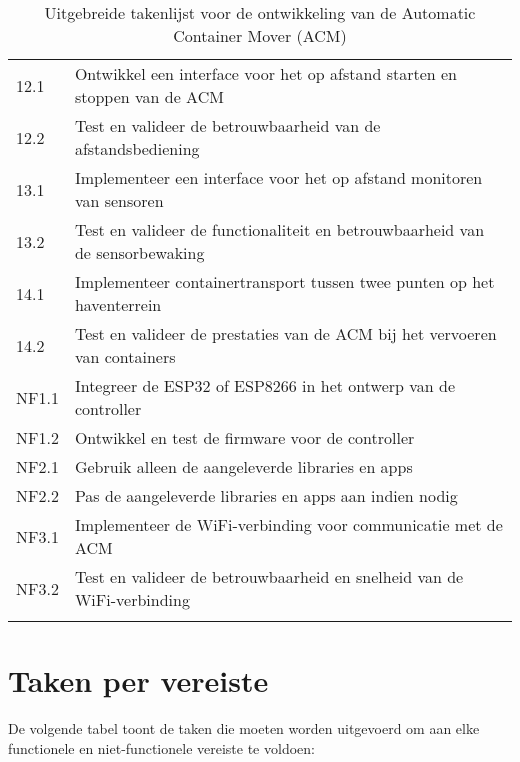 \begin{longtable}{@{}ll@{}}
    12.1       & Ontwikkel een interface voor het op afstand starten en stoppen van de ACM                          \\
    12.2       & Test en valideer de betrouwbaarheid van de afstandsbediening                                       \\

    13.1       & Implementeer een interface voor het op afstand monitoren van sensoren                              \\
    13.2       & Test en valideer de functionaliteit en betrouwbaarheid van de sensorbewaking                       \\

    14.1       & Implementeer containertransport tussen twee punten op het haventerrein                             \\
    14.2       & Test en valideer de prestaties van de ACM bij het vervoeren van containers                         \\

    NF1.1      & Integreer de ESP32 of ESP8266 in het ontwerp van de controller                                     \\
    NF1.2      & Ontwikkel en test de firmware voor de controller                                                   \\

    NF2.1      & Gebruik alleen de aangeleverde libraries en apps                                                   \\
    NF2.2      & Pas de aangeleverde libraries en apps aan indien nodig                                             \\

    NF3.1      & Implementeer de WiFi-verbinding voor communicatie met de ACM                                       \\
    NF3.2      & Test en valideer de betrouwbaarheid en snelheid van de WiFi-verbinding                             \\

    \bottomrule
    \caption{Uitgebreide takenlijst voor de ontwikkeling van de Automatic Container Mover (ACM)}
    \label{tab:uitgebreide_takenlijst}
\end{longtable}


\section{Taken per vereiste}
De volgende tabel toont de taken die moeten worden uitgevoerd om aan elke functionele en niet-functionele vereiste te voldoen:

